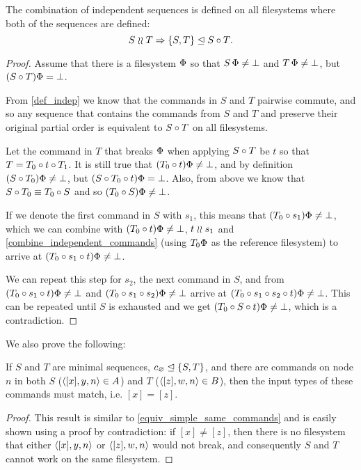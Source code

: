 \begin{mylem}
The combination of independent sequences is defined on all filesystems
where both of the sequences are defined:
\[ S\mathrel{\wr\wr} T \Rightarrow {\{{S,T}\}}\trianglelefteq{S\mathbin{\circ}T}. \]
\end{mylem}
\begin{proof}
Assume that there is a filesystem $\Phi$ so that
$S\,\Phi\neq\bot$ and $T\,\Phi\neq\bot$, but
$(S\mathbin{\circ} T)\Phi=\bot$.

From \cref{def_indep} we know that
the commands in $S$ and $T$ pairwise commute, and so any sequence
that contains the commands from $S$ and $T$ and preserve their original partial order
is equivalent to $S\mathbin{\circ} T$ on all filesystems.

Let the command in $T$ that breaks $\Phi$ when applying $S\mathbin{\circ} T$ be $t$
so that $T=T_0\mathbin{\circ} t\mathbin{\circ} T_1$.
It is still true that $(T_0 \mathbin{\circ} t)\Phi\neq\bot$,
and by definition $(S\mathbin{\circ} T_0)\Phi\neq\bot$,
but $(S\mathbin{\circ} T_0\mathbin{\circ} t)\Phi=\bot$.
Also, from above we know that $S\mathbin{\circ} T_0\equiv T_0\mathbin{\circ} S$
and so $(T_0 \mathbin{\circ} S)\Phi\neq\bot$.

If we denote the first command in $S$ with $s_1$,
this means that $(T_0 \mathbin{\circ} s_1)\Phi\neq\bot$,
which we can combine with $(T_0 \mathbin{\circ} t)\Phi\neq\bot$, $t\mathrel{\wr\wr} s_1$ and
\cref{combine_independent_commands}
(using $T_0\Phi$ as the reference filesystem)
to arrive at $(T_0 \mathbin{\circ} s_1\mathbin{\circ} t)\Phi\neq\bot$.

We can repeat this step for $s_2$, the next command in $S$,
and from 
$(T_0 \mathbin{\circ} s_1\mathbin{\circ} t)\Phi\neq\bot$
and
$(T_0 \mathbin{\circ} s_1\mathbin{\circ} s_2)\Phi\neq\bot$
arrive at
$(T_0 \mathbin{\circ} s_1\mathbin{\circ} s_2\mathbin{\circ} t)\Phi\neq\bot$.
This can be repeated until $S$ is exhausted and we get
$(T_0 \mathbin{\circ} S\mathbin{\circ} t)\Phi\neq\bot$, which is a contradiction.
\end{proof}

We also prove the following:

\begin{mylem}
If $S$ and $T$ are minimal sequences, ${c_\varnothing}\trianglelefteq{\{{S,T}\}}$,
and there are commands on node $n$ in both $S$ ($\langle{[x],y,n}\rangle\in A$) and $T$ ($\langle{[z],w,n}\rangle\in B$),
then the input types of these commands must match, i.e. $[x]=[z]$.
\end{mylem}
\begin{proof}
This result is similar to \cref{equiv_simple_same_commands} and
is easily shown using a proof by contradiction: if $[x]\neq [z]$, then there is no filesystem that
either $\langle{[x],y,n}\rangle$ or $\langle{[z],w,n}\rangle$ would not break, 
and consequently $S$ and $T$ cannot work on the same filesystem.
\end{proof}


